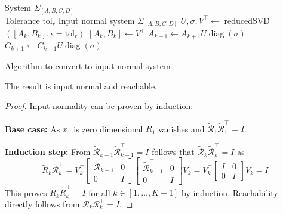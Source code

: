 \documentclass[numbers=noenddot,doctype=mastersthesis,BCOR=15mm,biblatex]{ldvbook}%
\newcommand{\Input}{\Require}
\newcommand{\Output}{\Ensure}
\newcommand{\spaceIO}{\phantom{Output:Input}\hspace{-0.7cm}}
\DeclareMathOperator{\diag}{diag}
\newcommand{\R}{\mathcal{R}} %
\newcommand{\eye}{I} %
\begin{document}
\begin{algorithm}[htb]
	\begin{algorithmic}
	\Input System $\Sigma_{[A,B,C,D]}$\\
	\spaceIO Tolerance $\text{tol}_r$ 
	\Output Input normal system $\Sigma_{[A,B,C,D]}$
		\State $U,\sigma,V^\top \gets$ reducedSVD$([A_k,B_k],\epsilon=\text{tol}_r)$
		\State $[A_k,B_k] \gets V^\top$
		\State $A_{k+1}\gets A_{k+1}U\diag(\sigma)$
		\State $C_{k+1}\gets C_{k+1}U\diag(\sigma)$
	\EndFor
	\end{algorithmic}
\caption{Algorithm to convert to input normal system}\label{alg:inp_normal}
\end{algorithm}

The result is input normal and reachable.
\begin{proof}
	Input normality can be proven by induction:
	
	\noindent\textbf{Base case:}
	As $x_1$ is zero dimensional $R_1$ vanishes and 
	$\tilde{\R}_{1}\tilde{\R}_{1}^\top = \eye$.
	
	\noindent\textbf{Induction step:}
	From $\tilde{\R}_{k-1}\tilde{\R}_{k-1}^\top = \eye$ follows that $\tilde{\R}_k\tilde{\R}_k^\top = \eye$ as
	\begin{equation}\label{eq:induction_reach}
	\tilde{R}_k\tilde{\R}_k^\top
	=
	V_k^\top\begin{bmatrix}\tilde{\R}_{k-1} &0\\
		0& \eye \end{bmatrix}
	\begin{bmatrix}\tilde{\R}_{k-1}^\top &0\\
		0& \eye \end{bmatrix} V_k
	= 
	V_k^\top\begin{bmatrix}\eye &0\\
	0& \eye \end{bmatrix} V_k
	=
	\eye
	\end{equation}
	This proves $\tilde{R}_k\tilde{R}_k^\top = \eye$ for all $k \in [1,\dots,K-1]$ by induction.
	Reachability directly follows from $\R_k\R_k^\top = \eye$.
\end{proof}
\end{document}
